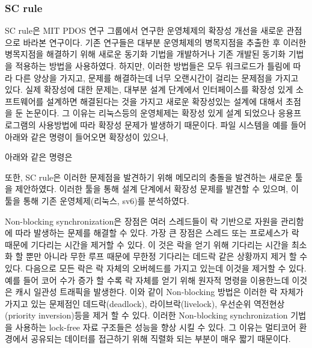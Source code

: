  

\subsubsection{SC rule}

SC rule은 MIT  PDOS 연구 그룹에서 연구한 운영체제의 확장성 개선을 새로운 관점으로 바라본 연구이다. 
기존 연구들은 대부분 운영체제의 병목지점을 추출한 후 이러한 병목지점을 해결하기 위해 새로운 
동기화 기법을 개발하거나 기존 개발된 동기화 기법을 적용하는 방법을 사용하였다. 하지만, 이러한 방법들은 
모두 워크로드가 틀림에 따라 다른 양상을 가지고, 문제를 해결하는데 너무 오랜시간이 걸리는 문제점을 가지고 있다.
실제 확장성에 대한 문제는, 대부분 설계 단계에서 인터페이스를 확장성 있게 소프트웨어를 설계하면 해결된다는 것을 
가지고 새로운 확장성있는 설계에 대해서 초점을 둔 논문이다.
그 이유는 리눅스등의 운영체제는 확장성 있게 설계 되었으나 응용프로그램의 사용방법에 따라 확장성 문제가 발생하기 
때문이다.
파일 시스템을 예를 들어 아래와 같은 명령이 들어오면 확장성이 있으나, 

아래와 같은 명령은 
 
또한, SC rule은 이러한 문제점을 발견하기 위해 메모리의 충돌을 발견하는 새로운 툴을 제안하였다. 
이러한 툴을 통해 설계 단계에서 확장성 문제를 발견할 수 있으며, 이 툴을 통해 기존 운영체제(리눅스, sv6)를 
분석하였다. 

Non-blocking synchronization은 장점은 여러 스레드들이 락 기반으로 자원을 관리함에 따라
 발생하는 문제를 해결할 수 있다. 
가장 큰 장점은 스레드 또는 프로세스가 락 때문에 기다리는 시간을 제거할 수 있다.
이 것은 락을 얻기 위해 기다리는 시간을 최소화 할 뿐만 아니라 무한 루프 때문에 무한정 기다리는 
데드락 같은 상황까지 제거 할 수 있다. 
다음으로 모든 락은 락 자체의 오버헤드를 가지고 있는데 이것을 제거할 수 있다. 
예를 들어 코어 수가 증가 할 수록 락 자체를 얻기 위해 원자적 명령을 이용한느데 이것은 캐시 일관성 트래픽을 
발생한다. 
이와 같이 Non-blocking 방법은 이러한 락 자체가 가지고 있는 문제점인 데드락(deadlock), 라이브락(livelock), 
우선순위 역전현상(priority inversion)등을 제거 할 수 있다. 
이러한 Non-blocking synchronization 기법을 사용하는 lock-free 자료 구조들은 성능을 향상 시킬 수 있다. 
그 이유는 멀티코어 환경에서 공유되는 데이터를 접근하기 위해 직렬화 되는 부분이 매우 짧기 때문이다. 


